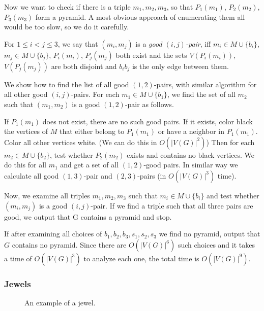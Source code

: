 \documentclass{report}
\begin{document}
Now we want to check if there is a triple $m_1, m_2, m_3$, so that $P_1(m_1)$, $P_2(m_2)$, $P_3(m_3)$ form a pyramid. A most obvious approach of enumerating them all would be too slow, so we do it carefully.

For $1 \leq i < j \leq 3$, we say that $(m_i, m_j)$ is a \emph{good $(i, j)$-pair}, iff $m_i \in M \cup \{b_i\}$, $m_j \in M \cup \{b_j\}$, $P_i(m_i)$, $P_j(m_j)$ both exist and the sets $V(P_i(m_i))$,$V(P_j(m_j))$ are both disjoint and $b_ib_j$ is the only edge between them.

We show how to find the list of all good $(1, 2)$-pairs, with similar algorithm for all other good $(i, j)$-pairs. For each $m_1 \in M \cup \{b_1\}$, we find the set of all $m_2$ such that $(m_1, m_2)$ is a good $(1,2)$-pair as follows.

If $P_1(m_1)$ does not exist, there are no such good pairs. If it exists, color black the vertices of $M$ that either belong to $P_1(m_1)$ or have a neighbor in $P_1(m_1)$. Color all other vertices white. (We can do this in $O(|V(G)|^2)$) Then for each $m_2 \in M \cup \{b_2\}$, test whether $P_2(m_2)$ exists and contains no black vertices. We do this for all $m_1$ and get a set of all $(1,2)$-good pairs. In similar way we calculate all good $(1,3)$-pair and $(2,3)$-pairs (in $O(|V(G)|^3)$ time).

Now, we examine all triples $m_1, m_2, m_3$ such that $m_i \in M \cup \{b_i\}$ and test whether $(m_i, m_j)$ is a good $(i, j)$-pair. If we find a triple such that all three pairs are good, we output that G contains a pyramid and stop.

If after examining all choices of $b_1, b_2, b_3, s_1, s_2, s_3$ we find no pyramid, output that $G$ contains no pyramid. Since there are $O(|V(G)|^6)$ such choices and it takes a time of $O(|V(G)|^3)$ to analyze each one, the total time is $O(|V(G)|^9)$.



\subsubsection{Jewels}

\begin{wrapfigure}{r}{0.35\textwidth}
	
	\caption{An example of a jewel.}
	\vspace{-1.5cm}
\end{wrapfigure}
\end{document}
